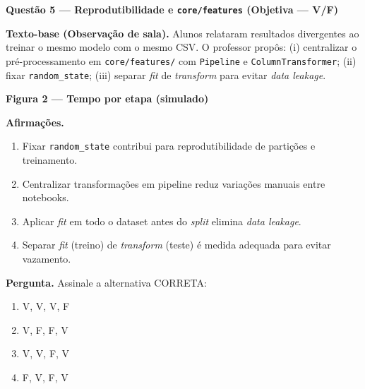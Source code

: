 \documentclass[12pt,a4paper]{article}
\begin{document}
\newpage
\noindent\textbf{Questão 5 — Reprodutibilidade e \texttt{core/features} (Objetiva — V/F)}
\par\noindent\textbf{Texto-base (Observação de sala).} Alunos relataram resultados divergentes ao treinar o mesmo modelo com o mesmo CSV. O professor propôs: (i) centralizar o pré-processamento em \texttt{core/features/} com \texttt{Pipeline} e \texttt{ColumnTransformer}; (ii) fixar \texttt{random\_state}; (iii) separar \textit{fit} de \textit{transform} para evitar \emph{data leakage}.

\vspace{0.5em}
\noindent\textbf{Figura 2 — Tempo por etapa (simulado)}
\begin{center}
\end{center}

\noindent\textbf{Afirmações.}
\begin{enumerate}[label=\Roman*.]
\item Fixar \texttt{random\_state} contribui para reprodutibilidade de partições e treinamento.
\item Centralizar transformações em pipeline reduz variações manuais entre notebooks.
\item Aplicar \textit{fit} em todo o dataset antes do \textit{split} elimina \emph{data leakage}.
\item Separar \textit{fit} (treino) de \textit{transform} (teste) é medida adequada para evitar vazamento.
\end{enumerate}

\noindent\textbf{Pergunta.} Assinale a alternativa CORRETA:
\begin{enumerate}[label=\alph*)]
\item V, V, V, F \qquad
\item V, F, F, V \qquad
\item V, V, F, V \qquad
\item F, V, F, V
\end{enumerate}
\end{document}
